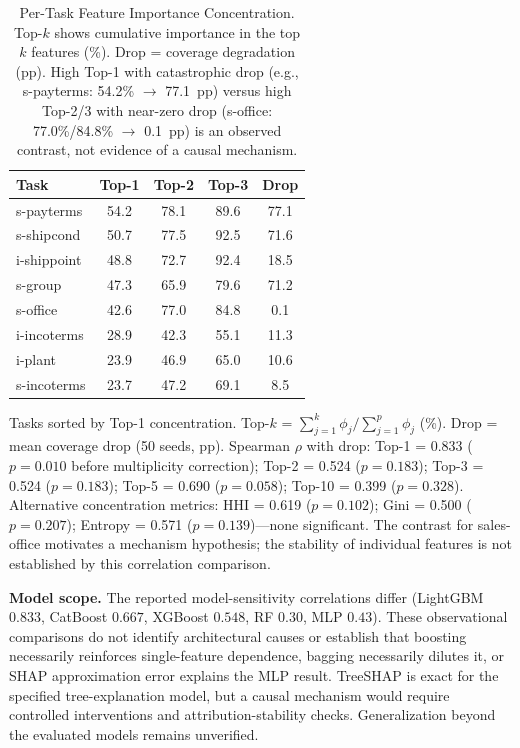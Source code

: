 \documentclass[accepted]{uai2026} %
\begin{document}
\begin{table}[t]
\centering
\caption{Per-Task Feature Importance Concentration. Top-$k$ shows cumulative importance in the top $k$ features (\%). Drop = coverage degradation (pp). High Top-1 with catastrophic drop (e.g., s-payterms: 54.2\% $\rightarrow$ 77.1~pp) versus high Top-2/3 with near-zero drop (s-office: 77.0\%/84.8\% $\rightarrow$ 0.1~pp) is an observed contrast, not evidence of a causal mechanism.}\label{tab:topk_concentration}
\small
\begin{tabular}{@{}lcccc@{}}
\toprule
Task & Top-1 & Top-2 & Top-3 & Drop \\
\midrule
s-payterms & 54.2 & 78.1 & 89.6 & 77.1 \\
s-shipcond & 50.7 & 77.5 & 92.5 & 71.6 \\
i-shippoint & 48.8 & 72.7 & 92.4 & 18.5 \\
s-group & 47.3 & 65.9 & 79.6 & 71.2 \\
s-office & 42.6 & 77.0 & 84.8 & 0.1 \\
i-incoterms & 28.9 & 42.3 & 55.1 & 11.3 \\
i-plant & 23.9 & 46.9 & 65.0 & 10.6 \\
s-incoterms & 23.7 & 47.2 & 69.1 & 8.5 \\
\bottomrule
\end{tabular}

\raggedright
\footnotesize
Tasks sorted by Top-1 concentration. Top-$k$ = $\sum_{j=1}^{k} \phi_j / \sum_{j=1}^{p} \phi_j$ (\%). Drop = mean coverage drop (50 seeds, pp). Spearman $\rho$ with drop: Top-1 = 0.833 ($p=0.010$ before multiplicity correction); Top-2 = 0.524 ($p=0.183$); Top-3 = 0.524 ($p=0.183$); Top-5 = 0.690 ($p=0.058$); Top-10 = 0.399 ($p=0.328$). Alternative concentration metrics: HHI = 0.619 ($p=0.102$); Gini = 0.500 ($p=0.207$); Entropy = 0.571 ($p=0.139$)---none significant. The contrast for sales-office motivates a mechanism hypothesis; the stability of individual features is not established by this correlation comparison.
\end{table}

\textbf{Model scope.} The reported model-sensitivity correlations differ (LightGBM $0.833$, CatBoost $0.667$, XGBoost $0.548$, RF $0.30$, MLP $0.43$). These observational comparisons do not identify architectural causes or establish that boosting necessarily reinforces single-feature dependence, bagging necessarily dilutes it, or SHAP approximation error explains the MLP result. TreeSHAP is exact for the specified tree-explanation model, but a causal mechanism would require controlled interventions and attribution-stability checks. Generalization beyond the evaluated models remains unverified.
\end{document}
